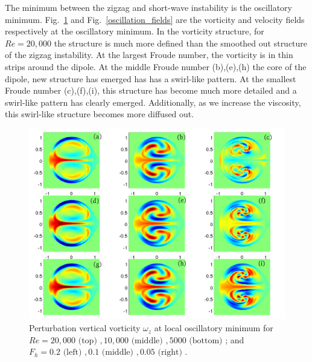 The minimum between the zigzag and short-wave instability is the oscillatory minimum. Fig.~\ref{oscillation_vorticity} and Fig.~\ref{oscillation_fields} are the vorticity and velocity fields respectively at the oscillatory minimum. In the vorticity structure, for $Re=20{,}000$ the structure is much more defined than the smoothed out structure of the zigzag instability. At the largest Froude number, the vorticity is in thin strips around the dipole. At the middle Froude number (b),(e),(h) the core of the dipole, new structure has emerged has has a swirl-like pattern. At the smallest Froude number (c),(f),(i), this structure has become much more detailed and a swirl-like pattern has clearly emerged. Additionally, as we increase the viscosity, this swirl-like structure becomes more diffused out. 
\begin{figure}
\begin{center}
\includegraphics[width=\textwidth]{vorticity_oscillation}
\caption{Perturbation vertical vorticity $\omega_{z}$ at local oscillatory minimum for $Re=20{,}000\text{ (top) }, 10{,}000 \text{ (middle) }, 5000 \text{ (bottom) }$; and $F_{h}=0.2 \text{ (left) }, 0.1 \text{ (middle) }, 0.05 \text{ (right) }$.}
\label{oscillation_vorticity}
\end{center}
\end{figure} 
